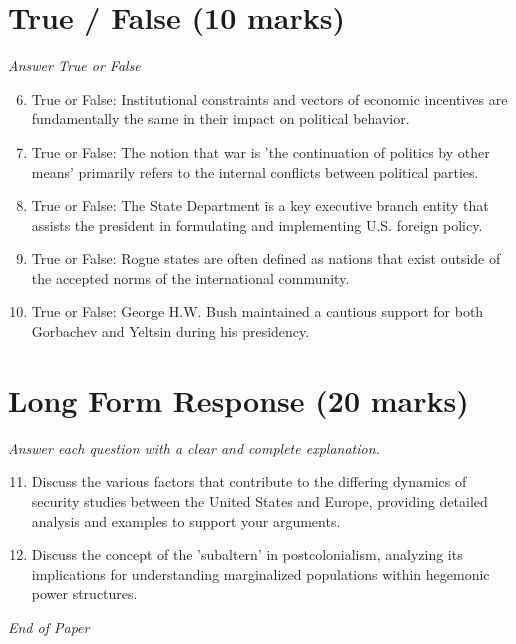 \documentclass[12pt]{article}
\begin{document}
\section*{True / False (10 marks)}
\textit{Answer True or False}
\begin{enumerate}[label=\arabic*.]
\setcounter{enumi}{5}
\item True or False: Institutional constraints and vectors of economic incentives are fundamentally the same in their impact on political behavior.
\item True or False: The notion that war is 'the continuation of politics by other means' primarily refers to the internal conflicts between political parties.
\item True or False: The State Department is a key executive branch entity that assists the president in formulating and implementing U.S. foreign policy.
\item True or False: Rogue states are often defined as nations that exist outside of the accepted norms of the international community.
\item True or False: George H.W. Bush maintained a cautious support for both Gorbachev and Yeltsin during his presidency.
\end{enumerate}

\section*{Long Form Response (20 marks)}
\textit{Answer each question with a clear and complete explanation.}
\begin{enumerate}[label=\arabic*.]
\setcounter{enumi}{10}
\item Discuss the various factors that contribute to the differing dynamics of security studies between the United States and Europe, providing detailed analysis and examples to support your arguments.
\item Discuss the concept of the 'subaltern' in postcolonialism, analyzing its implications for understanding marginalized populations within hegemonic power structures.
\end{enumerate}

\vfill
\noindent\textit{End of Paper}
\end{document}
